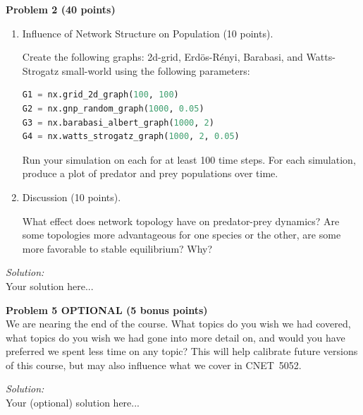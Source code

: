 \documentclass{article}
\newenvironment{problem}[2][Problem]
    { \begin{mdframed}[backgroundcolor=gray!20] \textbf{#1 #2} \\}
    {  \end{mdframed}}
\newenvironment{solution}
    {\noindent \textit{Solution:}\vspace{1em}\\}
    {\newpage}
\begin{document}
\begin{problem}{2 (40 points)}
\begin{enumerate}[label=(\alph*)]
        If you need to adjust starting populations or your $\alpha, \beta, \gamma, \delta$ parameters to produce interesting results, do so. For example, if you find that all the predators quickly die without reproducing, you may need to increase $\beta$ or $\gamma$ or decrease $\delta$ a little.
        
        You do not need to produce a plot like the one above, but it may help your debugging.

        \item Influence of Network Structure on Population (10 points).

        Create the following graphs: 2d-grid, Erd\"{o}s-R\'{e}nyi, Barabasi, and Watts-Strogatz small-world using the following parameters:

        \begin{lstlisting}[language=python,numbers=none]
G1 = nx.grid_2d_graph(100, 100)
G2 = nx.gnp_random_graph(1000, 0.05)
G3 = nx.barabasi_albert_graph(1000, 2)
G4 = nx.watts_strogatz_graph(1000, 2, 0.05)
        \end{lstlisting}
        
        Run your simulation on each for at least 100 time steps. For each simulation, produce a plot of predator and prey populations over time.

        \item Discussion (10 points).

        What effect does network topology have on predator-prey dynamics? Are some topologies more advantageous for one species or the other, are some more favorable to stable equilibrium? Why?

        
    \end{enumerate}
\end{problem}

\begin{solution}
    Your solution here...
\end{solution}

\begin{problem}{5 \textbf{OPTIONAL} (5 bonus points)}
    We are nearing the end of the course. What topics do you wish we had covered, what topics do you wish we had gone into more detail on, and would you have preferred we spent less time on any topic? This will help calibrate future versions of this course, but may also influence what we cover in CNET~5052.
\end{problem}

\begin{solution}
    Your (optional) solution here...
\end{solution}
\end{document}
